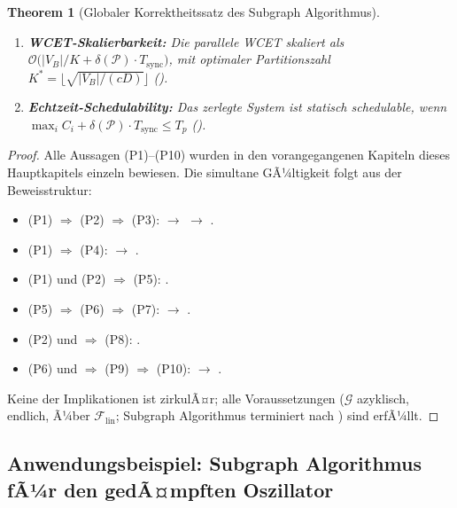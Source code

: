 ﻿\documentclass[12pt,a4paper]{article}
\newtheorem{theorem}{Theorem}[section]
\theoremstyle{definition}
\begin{document}
\begin{theorem}[Globaler Korrektheitssatz des Subgraph Algorithmus]
\begin{enumerate}[label=\textbf{(P\arabic*)}]
  \item \textbf{WCET-Skalierbarkeit:}
        Die parallele WCET skaliert als
        $\mathcal{O}\bigl(|V_B|/K + \delta(\mathcal{P}) \cdot T_{\mathrm{sync}}\bigr)$,
        mit optimaler Partitionszahl
        $K^* = \lfloor\sqrt{|V_B|/(cD)}\rfloor$
        ().

  \item \textbf{Echtzeit-Schedulability:}
        Das zerlegte System ist statisch schedulable, wenn
        $\max_i C_i + \delta(\mathcal{P}) \cdot T_{\mathrm{sync}} \leq T_p$
        ().
\end{enumerate}
\end{theorem}

\begin{proof}
Alle Aussagen (P1)--(P10) wurden in den vorangegangenen Kapiteln
dieses Hauptkapitels einzeln bewiesen. Die simultane GÃ¼ltigkeit folgt aus
der Beweisstruktur:
\begin{itemize}[nosep]
  \item (P1) $\Rightarrow$ (P2) $\Rightarrow$ (P3):
         $\to$  $\to$ .
  \item (P1) $\Rightarrow$ (P4):
         $\to$ .
  \item (P1) und (P2) $\Rightarrow$ (P5):
        .
  \item (P5) $\Rightarrow$ (P6) $\Rightarrow$ (P7):
         $\to$ .
  \item (P2) und  $\Rightarrow$ (P8):
        .
  \item (P6) und  $\Rightarrow$ (P9) $\Rightarrow$ (P10):
         $\to$ .
\end{itemize}
Keine der Implikationen ist zirkulÃ¤r; alle Voraussetzungen
($\mathcal{G}$ azyklisch, endlich, Ã¼ber $\mathcal{F}_{\mathrm{lin}}$;
Subgraph Algorithmus terminiert nach ) sind erfÃ¼llt.
\end{proof}

\subsection{Anwendungsbeispiel: Subgraph Algorithmus fÃ¼r den gedÃ¤mpften Oszillator}
\label{subsec:subgraph-example}
\end{document}
